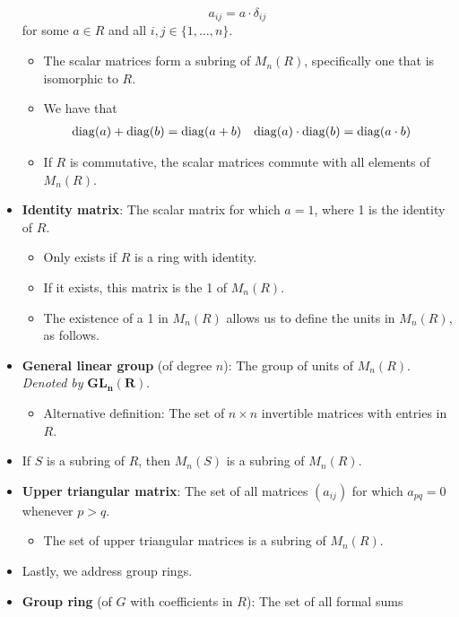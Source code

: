 \documentclass[../notes.tex]{subfiles}
\begin{document}
\begin{itemize}
    \begin{equation*}
        a_{ij} = a\cdot\delta_{ij}
    \end{equation*}
    for some $a\in R$ and all $i,j\in\{1,\dots,n\}$.
    \begin{itemize}
        \item The scalar matrices form a subring of $M_n(R)$, specifically one that is isomorphic to $R$.
        \item We have that
        \begin{align*}
            \operatorname{diag}(a)+\operatorname{diag}(b) &= \operatorname{diag}(a+b)&
            \operatorname{diag}(a)\cdot\operatorname{diag}(b) &= \operatorname{diag}(a\cdot b)
        \end{align*}
        \item If $R$ is commutative, the scalar matrices commute with all elements of $M_n(R)$.
    \end{itemize}
    \item \textbf{Identity matrix}: The scalar matrix for which $a=1$, where 1 is the identity of $R$.
    \begin{itemize}
        \item Only exists if $R$ is a ring with identity.
        \item If it exists, this matrix is the 1 of $M_n(R)$.
        \item The existence of a 1 in $M_n(R)$ allows us to define the units in $M_n(R)$, as follows.
    \end{itemize}
    \item \textbf{General linear group} (of degree $n$): The group of units of $M_n(R)$. \emph{Denoted by} $\bm{GL_n(R)}$.
    \begin{itemize}
        \item Alternative definition: The set of $n\times n$ invertible matrices with entries in $R$.
    \end{itemize}
    \item If $S$ is a subring of $R$, then $M_n(S)$ is a subring of $M_n(R)$.
    \item \textbf{Upper triangular matrix}: The set of all matrices $(a_{ij})$ for which $a_{pq}=0$ whenever $p>q$.
    \begin{itemize}
        \item The set of upper triangular matrices is a subring of $M_n(R)$.
    \end{itemize}
    \item Lastly, we address group rings.
    \item \textbf{Group ring} (of $G$ with coefficients in $R$): The set of all formal sums

\end{itemize}
\end{document}
